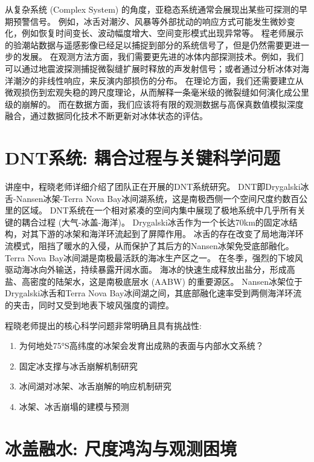 \documentclass[12pt, a4paper]{article}
\begin{document}
从复杂系统 (Complex System) 的角度，亚稳态系统通常会展现出某些可探测的早期预警信号。
例如，冰舌对潮汐、风暴等外部扰动的响应方式可能发生微妙变化，例如恢复时间变长、波动幅度增大、空间变形模式出现异常等。
程老师展示的验潮站数据与遥感影像已经足以捕捉到部分的系统信号了，但是仍然需要更进一步的发展。
在观测方法方面，我们需要更先进的冰体内部探测技术。例如，我们可以通过地震波探测捕捉微裂缝扩展时释放的声发射信号；或者通过分析冰体对海洋潮汐的非线性响应，来反演内部损伤的分布。
在理论方面，我们还需要建立从微观损伤到宏观失稳的跨尺度理论，从而解释一条毫米级的微裂缝如何演化成公里级的崩解的。
而在数据方面，我们应该将有限的观测数据与高保真数值模拟深度融合，通过数据同化技术不断更新对冰体状态的评估。



\section{DNT系统: 耦合过程与关键科学问题}

讲座中，程晓老师详细介绍了团队正在开展的DNT系统研究。
DNT即Drygalski冰舌-Nansen冰架-Terra Nova Bay冰间湖系统，这是南极西侧一个空间尺度约数百公里的区域。
DNT系统在一个相对紧凑的空间内集中展现了极地系统中几乎所有关键的耦合过程 (大气-冰盖-海洋)。
Drygalski冰舌作为一个长达70km的固定冰结构，对其下游的冰架和海洋环流起到了屏障作用。
冰舌的存在改变了局地海洋环流模式，阻挡了暖水的入侵，从而保护了其后方的Nansen冰架免受底部融化。
Terra Nova Bay冰间湖是南极最活跃的海冰生产区之一。
在冬季，强烈的下坡风驱动海冰向外输送，持续暴露开阔水面。
海冰的快速生成释放出盐分，形成高盐、高密度的陆架水，这是南极底层水 (AABW) 的重要源区。
Nansen冰架位于Drygalski冰舌和Terra Nova Bay冰间湖之间，其底部融化速率受到两侧海洋环流的夹击，同时又受到地表下坡风强度的调控。

程晓老师提出的核心科学问题非常明确且具有挑战性:
\begin{enumerate}
    \item 为何地处75°S高纬度的冰架会发育出成熟的表面与内部水文系统？
    \item 固定冰支撑与冰舌崩解机制研究
    \item 冰间湖对冰架、冰舌崩解的响应机制研究
    \item 冰架、冰舌崩塌的建模与预测
\end{enumerate}



\section{冰盖融水: 尺度鸿沟与观测困境}
\end{document}
